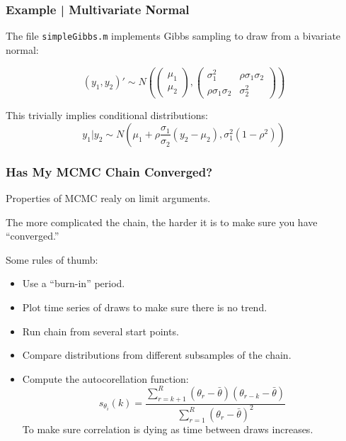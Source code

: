 \documentclass[11pt, aspectratio=169]{beamer}
\newcommand{\Skip}{\vspace{1em}}
\begin{document}
\begin{frame}[c]\frametitle{Example | Multivariate Normal}
    
The file {\tt simpleGibbs.m} implements Gibbs sampling to draw from a bivariate normal: 

$$(y_1, y_2)' \sim N\left( \begin{pmatrix} \mu_1 \\ \mu_2 \end{pmatrix}, \begin{pmatrix} \sigma_1^2 & \rho \sigma_1 \sigma_2 \\ \rho \sigma_1 \sigma_2 & \sigma_2^2 \end{pmatrix} \right) $$

This trivially implies conditional distributions: 
$$y_1 | y_2 \sim N(\mu_1 + \rho \frac{\sigma_1}{\sigma_2}(y_2 - \mu_2), \sigma_1^2(1 - \rho^2))$$



\end{frame}


\begin{frame}[c]\frametitle{Has My MCMC Chain Converged?}
    
Properties of MCMC realy on limit arguments.  

\Skip
The more complicated the chain, the harder it is to make sure you have ``converged.''    


\Skip
Some rules of thumb:
\begin{itemize}
  \item Use a ``burn-in'' period. 
  \item Plot time series of draws to make sure there is no trend. 
  \item Run chain from several start points. 
  \item Compare distributions from different subsamples of the chain. 
  \item Compute the autocorellation function: 
$$s_{\theta_i}(k) = \frac{ \sum_{r = k+1}^R (\theta_r - \bar{\theta})(\theta_{r-k} - \bar{\theta})}{ \sum_{r=1}^R  (\theta_r - \bar{\theta})^2} $$
To make sure correlation is dying as time between draws increases. 
\end{itemize}    


\end{frame}
\end{document}
